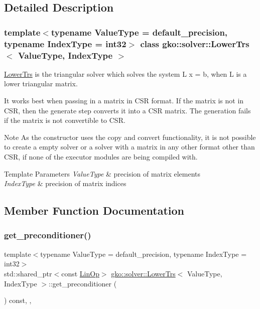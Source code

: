 \subsection{Detailed Description}
\subsubsection*{template$<$typename Value\+Type = default\+\_\+precision, typename Index\+Type = int32$>$\newline
class gko\+::solver\+::\+Lower\+Trs$<$ Value\+Type, Index\+Type $>$}

\hyperlink{classgko_1_1solver_1_1LowerTrs}{Lower\+Trs} is the triangular solver which solves the system L x = b, when L is a lower triangular matrix. 

It works best when passing in a matrix in C\+SR format. If the matrix is not in C\+SR, then the generate step converts it into a C\+SR matrix. The generation fails if the matrix is not convertible to C\+SR.

\begin{DoxyNote}{Note}
As the constructor uses the copy and convert functionality, it is not possible to create a empty solver or a solver with a matrix in any other format other than C\+SR, if none of the executor modules are being compiled with.
\end{DoxyNote}

\begin{DoxyTemplParams}{Template Parameters}
{\em Value\+Type} & precision of matrix elements \\
\hline
{\em Index\+Type} & precision of matrix indices \\
\hline
\end{DoxyTemplParams}


\subsection{Member Function Documentation}
\mbox{\label{classgko_1_1solver_1_1LowerTrs_a9ee1b8b9f5420c4214f22d15bf61e755}} 
\subsubsection{\texorpdfstring{get\+\_\+preconditioner()}{get\_preconditioner()}}
{\footnotesize\ttfamily template$<$typename Value\+Type  = default\+\_\+precision, typename Index\+Type  = int32$>$ \\
std\+::shared\+\_\+ptr$<$const \hyperlink{classgko_1_1LinOp}{Lin\+Op}$>$ \hyperlink{classgko_1_1solver_1_1LowerTrs}{gko\+::solver\+::\+Lower\+Trs}$<$ Value\+Type, Index\+Type $>$\+::get\+\_\+preconditioner (\begin{DoxyParamCaption}{ }\end{DoxyParamCaption}) const\hspace{0.3cm}{\ttfamily [inline]}, {\ttfamily [override]}, {\ttfamily [virtual]}}




